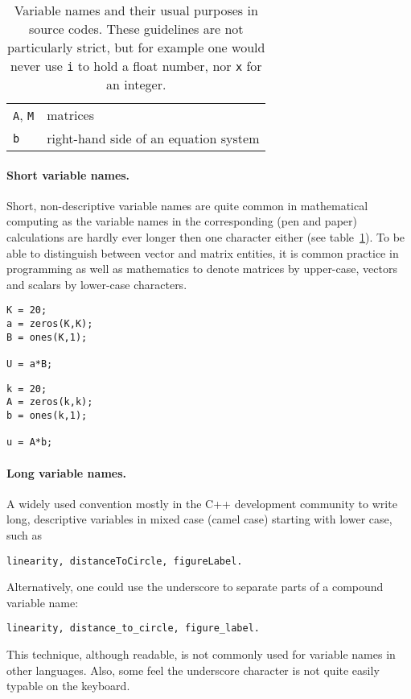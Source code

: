 \begin{itemize}
\begin{table}
\begin{tabular}{ll}
\lstinline!A!, \lstinline!M!                                  & matrices\\
\lstinline!b!                                                 & right-hand side of an equation system\\\bottomrule
\end{tabular}
\caption{Variable names and their usual purposes in source codes. These guidelines are not particularly strict, but for example one would never use \lstinline!i! to hold a float number, nor \lstinline!x! for an integer.}
\label{table:typical-variable-usage}
\end{table}
\end{itemize}

\paragraph{Short variable names.}
Short, non-descriptive variable names are quite common in mathematical
computing as the variable names in the corresponding (pen and paper)
calculations are hardly ever longer then one character either (see table~\ref{table:typical-variable-usage}). To be able to distinguish between vector
and matrix entities, it is common practice in programming as well as
mathematics to denote matrices by upper-case, vectors and scalars by
lower-case characters.

\hfill
\begin{minipage}[t]{.45\textwidth}
\begin{lstlisting}[framerule=2pt,rulecolor=\color{badred}]
K = 20;
a = zeros(K,K);
B = ones(K,1);

U = a*B;
\end{lstlisting}
\end{minipage}
\hfill
\begin{minipage}[t]{.45\textwidth}
\begin{lstlisting}[framerule=2pt,rulecolor=\color{goodgreen}]
k = 20;
A = zeros(k,k);
b = ones(k,1);

u = A*b;
\end{lstlisting}
\end{minipage}
\hfill


\paragraph{Long variable names.}
A widely used convention mostly in the C++ development community to write
long, descriptive variables in mixed case (camel case) starting with lower
case, such as
\begin{lstlisting}
linearity, distanceToCircle, figureLabel.
\end{lstlisting}
Alternatively, one could use the underscore to separate parts of a compound variable name:
\begin{lstlisting}
linearity, distance_to_circle, figure_label.
\end{lstlisting}
This technique, although readable, is not commonly used for variable names in other languages. Also, some feel the underscore character is not quite easily typable on the keyboard.

